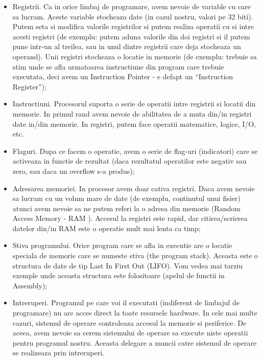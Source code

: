 \documentclass[a4paper,10pt]{article}
\begin{document}
\begin{itemize}
    \item Registrii. Ca in orice limbaj de programare, avem nevoie de variable cu care sa lucram. Aceste
variable stocheaza date (in cazul nostru, valori pe 32 biti). Putem seta si modifica valorile
registrilor si putem realiza operatii cu si intre acesti registri (de exemplu: putem aduna valorile
din doi registri si il putem pune intr-un al treilea, sau in unul dintre registrii care deja stocheaza
un operand). Unii registri stocheaza o locatie in memorie (de exemplu: trebuie sa stim unde
se afla urmatoarea instructiune din program care trebuie executata, deci avem un Instruction
Pointer - e defapt un “Instruction Register”);
    \item Instructiuni. Procesorul suporta o serie de operatii intre registrii si locatii din memorie. In
primul rand avem nevoie de abilitatea de a muta din/in registri date in/din memorie. In
registri, putem face operatii matematice, logice, I/O, etc.
    \item Flaguri. Dupa ce facem o operatie, avem o serie de flag-uri (indicatori) care se activeaza in
functie de rezultat (daca rezultatul operatilor este negativ sau zero, sau daca un overflow s-a
produs);
    \item  Adresarea memoriei. In procesor avem doar cativa registri. Daca avem nevoie sa lucram cu un
volum mare de date (de exemplu, continutul unui fisier) atunci avem nevoie sa ne putem referi
la o adresa din memorie (Random Access Memory - RAM ). Accesul la registri este rapid, dar
citirea/scrierea datelor din/in RAM este o operatie mult mai lenta ca timp;
    \item Stiva programului. Orice program care se afla in executie are o locatie speciala de memorie
care se numeste stiva (the program stack). Aceasta este o structura de date de tip Last In First
Out (LIFO). Vom vedea mai tarziu exemple unde aceasta structura este folositoare (apelul de
functii in Assembly);
    \item Intreruperi. Programul pe care voi il executati (indiferent de limbajul de programare) nu
are acces direct la toate resursele hardware. In cele mai multe cazuri, sistemul de operare
controleaza accesul la memorie si periferice. De aceea, avem nevoie sa cerem sistemului de
operare sa execute niste operatii pentru programul nostru. Aceasta delegare a muncii catre
sistemul de operare se realizeaza prin intreruperi.
\end{itemize}
\vspace{50pt}
\end{document}
